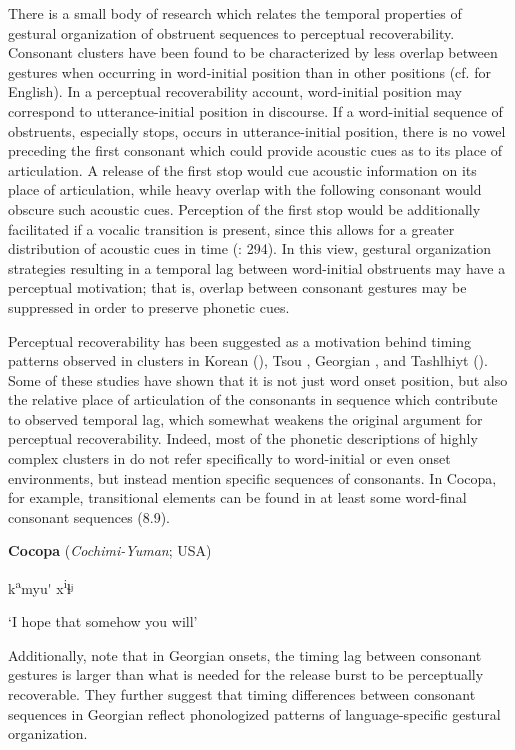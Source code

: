   There is a small body of research which relates the temporal properties of gestural organization of obstruent sequences to perceptual recoverability. Consonant clusters have been found to be characterized by less overlap between gestures when occurring in word-initial position than in other positions (cf. \citealt{Byrd1996a} for English). In a perceptual recoverability account, word-initial position may correspond to utterance-initial position in discourse. If a word-initial sequence of obstruents, especially stops, occurs in utterance-initial position, there is no vowel preceding the first consonant which could provide acoustic cues as to its place of articulation. A release of the first stop would cue acoustic information on its place of articulation, while heavy overlap with the following consonant would obscure such acoustic cues. Perception of the first stop would be additionally facilitated if a vocalic transition is present, since this allows for a greater distribution of acoustic cues in time (\citealt{RidouaneFougeron2011}: 294). In this view, gestural organization strategies resulting in a temporal lag between word-initial obstruents may have a perceptual motivation; that is, overlap between consonant gestures may be suppressed in order to preserve phonetic cues.

  Perceptual recoverability has been suggested as a motivation behind timing patterns observed in clusters in Korean (\citealt{SilvermanJun1994}), Tsou \citep{Wright1996}, Georgian \citep{ChitoranEtAl2002}, and Tashlhiyt (\citealt{RidouaneFougeron2011}). Some of these studies have shown that it is not just word onset position, but also the relative place of articulation of the consonants in sequence which contribute to observed temporal lag, which somewhat weakens the original argument for perceptual recoverability. Indeed, most of the phonetic descriptions of highly complex clusters in  do not refer specifically to word-initial or even onset environments, but instead mention specific sequences of consonants. In Cocopa, for example, transitional elements can be found in at least some word-final consonant sequences (8.9).

\ea\label{ex:(8.9)}
  \textbf{Cocopa} (\textit{Cochimi-Yuman}; USA)

k\textsuperscript{a}myu\'{} x\textsuperscript{i}ɬʲ

‘I hope that somehow you will’

\citep[47]{Crawford1966}
\z

Additionally, \citet{ChitoranCohn2009} note that in Georgian onsets, the timing lag between consonant gestures is larger than what is needed for the release burst to be perceptually recoverable. They further suggest that timing differences between consonant sequences in Georgian reflect phonologized patterns of language-specific gestural organization.

